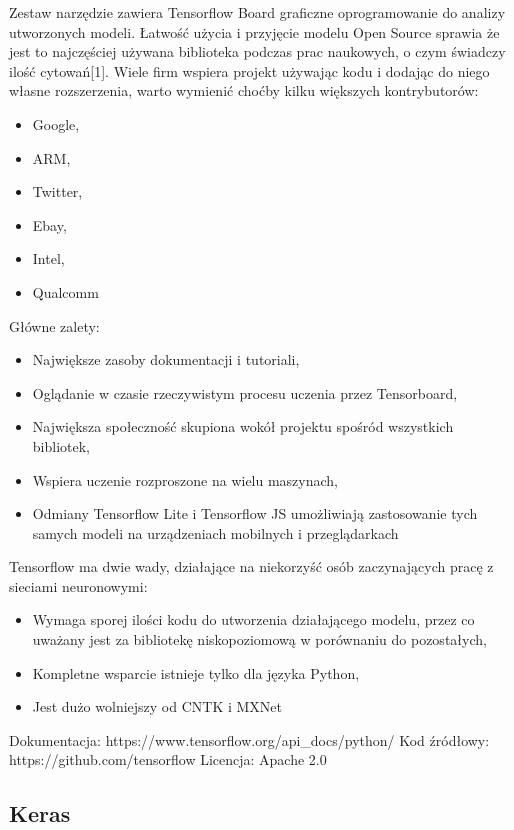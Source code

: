 \documentclass[12pt,a4paper,twoside,titlepage,openright]{book}
\begin{document}
Zestaw narzędzie zawiera Tensorflow Board graficzne oprogramowanie do analizy utworzonych modeli. Łatwość użycia i przyjęcie modelu Open Source sprawia że jest to najczęściej używana biblioteka podczas prac naukowych, o czym świadczy ilość cytowań[1]. Wiele firm wspiera projekt używając kodu i dodając do niego własne rozszerzenia, warto wymienić choćby kilku większych kontrybutorów:
\begin{itemize}
\item Google,
\item ARM,
\item Twitter,
\item Ebay,
\item Intel,
\item Qualcomm
\end{itemize}

Główne zalety:
\begin{itemize}
\item Największe zasoby dokumentacji i tutoriali,
\item Oglądanie w czasie rzeczywistym procesu uczenia przez Tensorboard,
\item Największa społeczność skupiona wokół projektu spośród wszystkich bibliotek,
\item Wspiera uczenie rozproszone na wielu maszynach,
\item Odmiany Tensorflow Lite i Tensorflow JS umożliwiają zastosowanie tych samych modeli na urządzeniach mobilnych i przeglądarkach
\end{itemize}

Tensorflow ma dwie wady, działające na niekorzyść osób zaczynających pracę z sieciami neuronowymi:
\begin{itemize}
\item Wymaga sporej ilości kodu do utworzenia działającego modelu, przez co uważany jest za bibliotekę niskopoziomową w porównaniu do pozostałych,
\item Kompletne wsparcie istnieje tylko dla języka Python, 
\item Jest dużo wolniejszy od CNTK i MXNet \cite{DBLP:journals/corr/ShiWXC16}
\end{itemize}

\noindent
\newline 
Dokumentacja: https://www.tensorflow.org/api\_docs/python/
\newline 
Kod źródłowy: https://github.com/tensorflow
\newline 
Licencja: Apache 2.0

\subsection{Keras}
\end{document}
